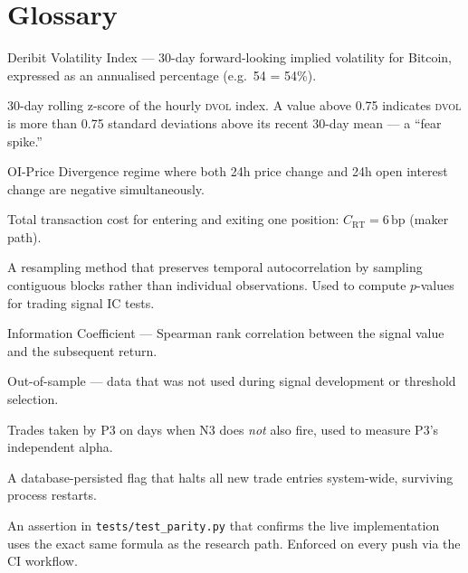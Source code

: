 \documentclass[12pt, a4paper]{article}
\theoremstyle{definition}
\newcommand{\bp}{\,\text{bp}}
\newcommand{\DVOL}{\textsc{dvol}}
\newcommand{\Nz}{N_{3z}}
\begin{document}
\section{Glossary}

\begin{description}[leftmargin=3cm, style=nextline]
    \item[\DVOL{}]
        Deribit Volatility Index — 30-day forward-looking implied volatility
        for Bitcoin, expressed as an annualised percentage (e.g.\ 54 = 54\%).

    \item[$\Nz$]
        30-day rolling z-score of the hourly \DVOL{} index. A value above 0.75
        indicates \DVOL{} is more than 0.75 standard deviations above its
        recent 30-day mean — a ``fear spike.''

    \item[DD regime]
        OI-Price Divergence regime where both 24h price change and 24h open
        interest change are negative simultaneously.

    \item[Round-trip cost]
        Total transaction cost for entering and exiting one position:
        $C_{\text{RT}} = 6\bp$ (maker path).

    \item[Block bootstrap]
        A resampling method that preserves temporal autocorrelation by
        sampling contiguous blocks rather than individual observations.
        Used to compute $p$-values for trading signal IC tests.

    \item[IC]
        Information Coefficient — Spearman rank correlation between the
        signal value and the subsequent return.

    \item[OOS]
        Out-of-sample — data that was not used during signal development
        or threshold selection.

    \item[Exclusive trades]
        Trades taken by P3 on days when N3 does \emph{not} also fire,
        used to measure P3's independent alpha.

    \item[Kill switch]
        A database-persisted flag that halts all new trade entries
        system-wide, surviving process restarts.

    \item[Parity test]
        An assertion in \texttt{tests/test\_parity.py} that confirms the live
        implementation uses the exact same formula as the research path.
        Enforced on every push via the CI workflow.
\end{description}
\end{document}
